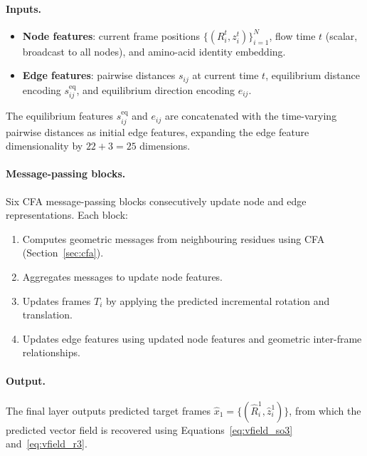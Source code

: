 \documentclass[12pt,a4paper]{article}
\begin{document}
\paragraph{Inputs.}
\begin{itemize}
  \item \textbf{Node features}: current frame positions $\{(R^t_i, z^t_i)\}_{i=1}^N$,
    flow time $t$ (scalar, broadcast to all nodes), and amino-acid identity embedding.
  \item \textbf{Edge features}: pairwise distances $s_{ij}$ at current time $t$, equilibrium
    distance encoding $s^{\mathrm{eq}}_{ij}$, and equilibrium direction encoding $e_{ij}$.
\end{itemize}
The equilibrium features $s^{\mathrm{eq}}_{ij}$ and $e_{ij}$ are concatenated with the
time-varying pairwise distances as initial edge features, expanding the edge feature
dimensionality by $22 + 3 = 25$ dimensions.

\paragraph{Message-passing blocks.}
Six CFA message-passing blocks consecutively update node and edge representations.  Each block:
\begin{enumerate}
  \item Computes geometric messages from neighbouring residues using CFA (Section~\ref{sec:cfa}).
  \item Aggregates messages to update node features.
  \item Updates frames $T_i$ by applying the predicted incremental rotation and translation.
  \item Updates edge features using updated node features and geometric inter-frame relationships.
\end{enumerate}

\paragraph{Output.}
The final layer outputs predicted target frames $\hat{x}_1 = \{(\hat{R}^1_i, \hat{z}^1_i)\}$,
from which the predicted vector field is recovered using Equations~\eqref{eq:vfield_so3}
and~\eqref{eq:vfield_r3}.
\end{document}
